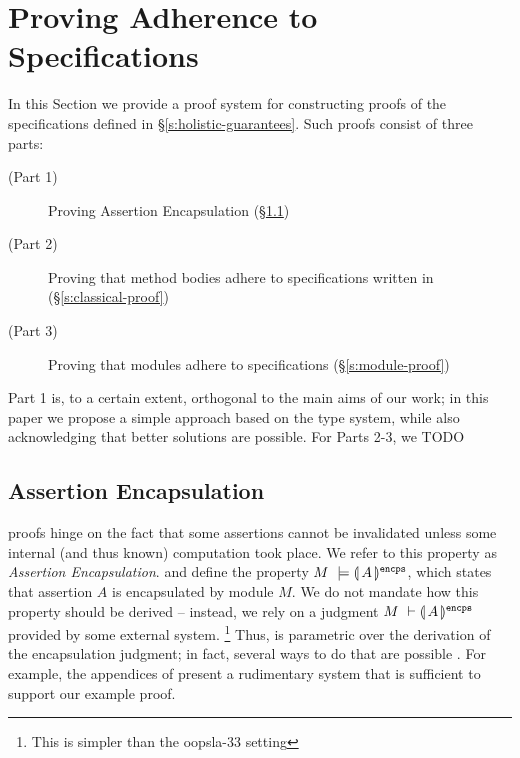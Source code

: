 \section{Proving Adherence to \SpecLang Specifications}
\label{s:inference}

In this Section we provide a proof system for constructing 
proofs of the \SpecLang specifications defined in \S \ref{s:holistic-guarantees}.
Such proofs consist of 
 three parts: %
\begin{description} 
\item[(Part 1)]
Proving Assertion Encapsulation (\S \ref{s:encaps-proof})
\item[(Part 2)]
Proving that   method bodies adhere to specifications written in \AssertLang (\S \ref{s:classical-proof})
\item[(Part 3)]
Proving that modules adhere to \SpecLang specifications (\S \ref{s:module-proof})
\end{description}

Part 1 is, to a certain extent, orthogonal to the main aims of our work;
in this paper we propose a simple approach based on the type system, while also acknowledging that 
better solutions are possible.
For Parts 2-3, we 
TODO


\subsection {Assertion Encapsulation}
\label{s:encaps-proof}

{
{\SpecLang proofs  hinge on the fact that some assertions cannot be invalidated unless some 
} internal (and thus known)
computation took place. 
{We refer to this property as \emph{Assertion Encapsulation}.}
}
and define the property $M\ \models  \llparenthesis\, A\, \rrparenthesis^{\texttt{encps}}$, which states that 
 assertion $A$ is encapsulated by module $M$.
We  do not mandate how this property should be derived -- instead, we rely on a judgment 
$M\ \vdash  \llparenthesis\, A\, \rrparenthesis^{\texttt{encps}}$ provided by some external system. \footnote{This is simpler than the oopsla-33 setting}
Thus, \SpecLang is parametric over the derivation of the encapsulation
     judgment; in fact, several ways to do that are possible \cite{TAME2003,ownEncaps,objInvars}. For example,
 the appendices of
    \cite{necessityFull} present a 
    rudimentary system that is sufficient to support our example
    proof.  

